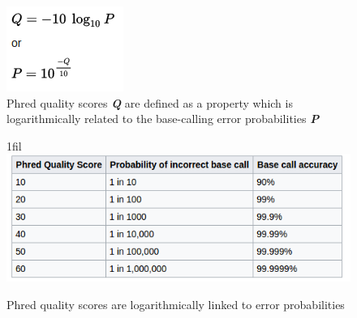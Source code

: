 \documentclass[12pt,openany]{llncs}
\makeatletter
\newcommand*{\centerfloat}{%
  \parindent \z@
  \leftskip \z@ \@plus 1fil \@minus \textwidth
  \rightskip\leftskip
  \parfillskip \z@skip}
\makeatother
\begin{document}
\begin{figure}
	\centering
	\includegraphics[width=0.4\linewidth]{./figs/NGS-3}
	\caption{\label{fig:fig-NGS-3}Phred quality scores 
	\textit{\textbf{Q}} are defined as a property which is logarithmically related to the base-calling error probabilities \textit{\textbf{P}}}
\end{figure}
\begin{figure}
	\centerfloat
	\includegraphics[width=1\linewidth]{./figs/NGS-4}
	\caption{\label{fig:fig-NGS-4}Phred quality scores are logarithmically linked to error probabilities}
\end{figure}
\end{document}
